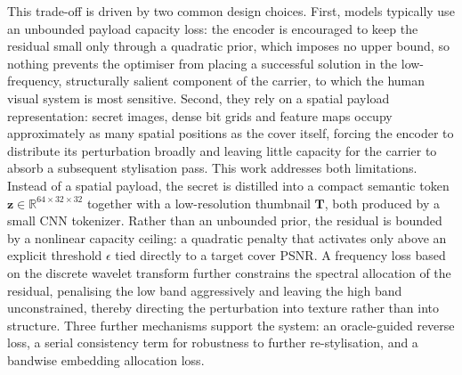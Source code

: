 \documentclass[conference]{IEEEtran}
\begin{document}
This trade-off is driven by two common design choices. First, models typically use an unbounded payload capacity loss: the encoder is encouraged to keep the residual small only through a quadratic prior, which imposes no upper bound, so nothing prevents the optimiser from placing a successful solution in the low-frequency, structurally salient component of the carrier, to which the human visual system is most sensitive. Second, they rely on a spatial payload representation: secret images, dense bit grids and feature maps occupy approximately as many spatial positions as the cover itself, forcing the encoder to distribute its perturbation broadly and leaving little capacity for the carrier to absorb a subsequent stylisation pass. This work addresses both limitations. Instead of a spatial payload, the secret is distilled into a compact semantic token $\mathbf{z}\!\in\!\mathbb{R}^{64\times32\times32}$ together with a low-resolution thumbnail $\mathbf{T}$, both produced by a small CNN tokenizer. Rather than an unbounded prior, the residual is bounded by a nonlinear capacity ceiling: a quadratic penalty that activates only above an explicit threshold $\epsilon$ tied directly to a target cover PSNR. A frequency loss based on the discrete wavelet transform further constrains the spectral allocation of the residual, penalising the low band aggressively and leaving the high band unconstrained, thereby directing the perturbation into texture rather than into structure. Three further mechanisms support the system: an oracle-guided reverse loss, a serial consistency term for robustness to further re-stylisation, and a bandwise embedding allocation loss.
\end{document}
